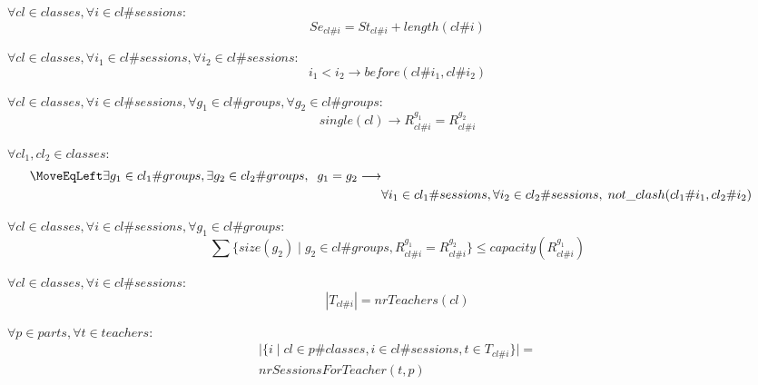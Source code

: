 $\forall cl \in classes, \forall i \in cl\#sessions :$
\begin{equation}
    Se_{cl\#i} = St_{cl\#i} + length(cl\#i)
\end{equation}

$\forall cl \in classes, \forall i_1 \in cl\#sessions, \forall i_2 \in cl\#sessions :$
\begin{equation}
    i_1 < i_2 \longrightarrow  before(cl\#{i_1}, cl\#{i_2})
\end{equation}

$\forall cl \in classes, \forall i \in cl\#sessions, \forall g_1 \in cl\#groups, \forall g_2\in cl\#groups :$
\begin{equation}
    single(cl) \longrightarrow R_{cl\#i}^{g_1} = R_{cl\#i}^{g_2}
\end{equation}

$\forall cl_1, cl_2 \in classes :$
\begin{equation}
    \begin{split}
        \MoveEqLeft
        \exists g_1 \in cl_1\#groups, \exists g_2 \in cl_2\#groups, \;\; g_1 = g_2 \longrightarrow \\ 
        & \forall i_1 \in cl_1\#sessions, \forall i_2 \in cl_2\#sessions,\; not\_clash(cl_1\#i_1, cl_2\#i_2)
    \end{split}
\end{equation}

$\forall cl \in classes, \forall i \in cl\#sessions, \forall g_1 \in cl\#groups :$
\begin{equation}
    \sum \{ size(g_2) \;|\; g_2 \in cl\#groups, R_{cl\#i}^{g_1} = R_{cl\#i}^{g_2} \} \leq capacity(R_{cl\#i}^{g_1})
\end{equation}

$\forall cl \in classes, \forall i \in cl\#sessions :$
\begin{equation}
    |T_{cl\#i}| = nrTeachers(cl)
\end{equation}

$\forall p \in parts, \forall t \in teachers :$
\begin{equation}
    \begin{split}
        |\{ i \;|\; cl \in p\#classes, i \in cl\#sessions, t \in T_{cl\#i} \}| = \\
        nrSessionsForTeacher(t,p)
    \end{split}
\end{equation}

